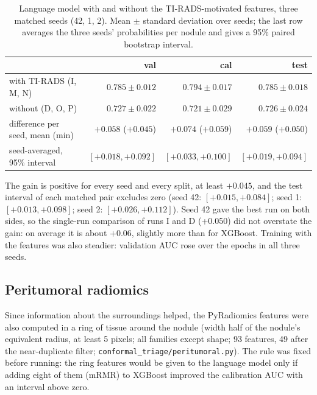 \begin{table}[ht]
  \centering
  \small
  \setlength{\tabcolsep}{4pt}
  \caption{Language model with and without the TI-RADS-motivated features, three matched seeds
           (42, 1, 2). Mean $\pm$ standard deviation over seeds; the last row averages the three
           seeds' probabilities per nodule and gives a 95\% paired bootstrap interval.}
  \label{tab:results-clinical-seeds}
  \begin{tabular}{lrrr}
    \toprule
    & val & cal & test \\
    \midrule
    with TI-RADS (I, M, N)        & $0.785 \pm 0.012$ & $0.794 \pm 0.017$ & $0.785 \pm 0.018$ \\
    without (D, O, P)             & $0.727 \pm 0.022$ & $0.721 \pm 0.029$ & $0.726 \pm 0.024$ \\
    difference per seed, mean (min) & $+0.058$ ($+0.045$) & $+0.074$ ($+0.059$) & $+0.059$ ($+0.050$) \\
    seed-averaged, 95\% interval  & $[+0.018, +0.092]$ & $[+0.033, +0.100]$ & $[+0.019, +0.094]$ \\
    \bottomrule
  \end{tabular}
\end{table}

The gain is positive for every seed and every split, at least $+0.045$, and the test interval of
each matched pair excludes zero (seed 42: $[+0.015, +0.084]$; seed 1: $[+0.013, +0.098]$; seed 2:
$[+0.026, +0.112]$). Seed 42 gave the best run on both sides, so the single-run comparison of
runs I and D (+0.050) did not overstate the gain: on average it is about $+0.06$, slightly more
than for XGBoost. Training with the features was also steadier: validation AUC rose over the
epochs in all three seeds.

\subsection{Peritumoral radiomics}
\label{sec:results-peri}

Since information about the surroundings helped, the PyRadiomics features were also computed in a
ring of tissue around the nodule (width half of the nodule's equivalent radius, at least 5
pixels; all families except shape; 93 features, 49 after the near-duplicate filter;
\texttt{conformal\_triage/peritumoral.py}). The rule was fixed before running: the ring features
would be given to the language model only if adding eight of them (mRMR) to XGBoost improved the
calibration AUC with an interval above zero.

